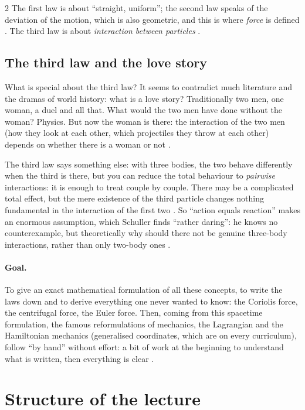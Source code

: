 \begin{paracol}{2}
The first law is about ``straight, uniform''; the second law speaks of the deviation of the motion, which is also
geometric, and this is where \emph{force} is defined . The third law is about
\emph{interaction between particles} .

\subsection{The third law and the love story}\label{ssec:bv-third}

What is special about the third law? It seems to contradict much literature and the dramas of world history: what is a
love story? Traditionally two men, one woman, a duel and all that. What would the two men have done without the woman?
Physics. But now the woman is there: the interaction of the two men (how they look at each other, which projectiles
they throw at each other) depends on whether there is a woman or not .

The third law says something else: with three bodies, the two behave differently when the third is there, but you can
reduce the total behaviour to \emph{pairwise} interactions: it is enough to treat couple by couple. There may be a
complicated total effect, but the mere existence of the third particle changes nothing fundamental in the interaction of
the first two . So ``action equals reaction'' makes an
enormous assumption, which Schuller finds ``rather daring'': he knows no counterexample, but theoretically why
should there not be genuine three-body interactions, rather than only two-body ones .

\paragraph{Goal.} To give an exact mathematical formulation of all these concepts, to write the laws down and to
derive everything one never wanted to know: the Coriolis force, the centrifugal force, the Euler force. Then, coming
from this spacetime formulation, the famous reformulations of mechanics, the Lagrangian and the Hamiltonian
mechanics (generalised coordinates, which are on every curriculum), follow ``by hand'' without effort: a bit of work at the
beginning to understand what is written, then everything is clear .

\section{Structure of the lecture}\label{sec:bv-structure}


\end{paracol}

